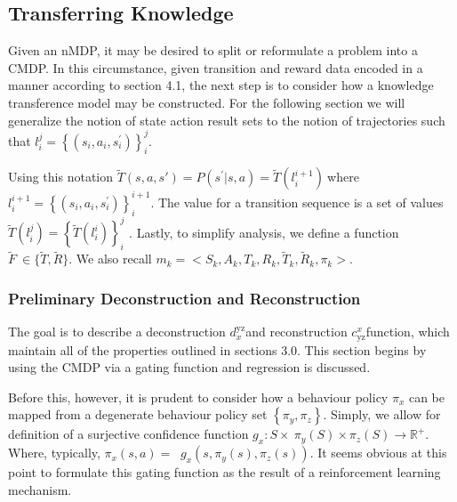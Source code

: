 \documentclass[compsoc,journal,letterpaper,10pt,draftclsnofoot,onecolumn]{IEEEtran}
\begin{document}
\subsection{Transferring Knowledge}\label{transferring-knowledge}

Given an nMDP, it may be desired to split or reformulate a problem into
a CMDP. In this circumstance, given transition and reward data encoded
in a manner according to section 4.1, the next step is to consider how a
knowledge transference model may be constructed. For the following
section we will generalize the notion of state action result sets to the
notion of trajectories such that
\(l_{i}^{j} = \left\{ (s_{i},a_{i},s_{i}^{'}) \right\}_{i}^{j}\).

Using this notation
\(\tilde{T}\left( s,a,s' \right) = P\left( s^{'}|s,a \right) = \tilde{T}\left( l_{i}^{i + 1} \right)\ \)where
\(l_{i}^{i + 1} = \left\{ (s_{i},a_{i},s_{i}^{'}) \right\}_{i}^{i + 1}\).
The value for a transition sequence is a set of values
\(\tilde{T}\left( l_{i}^{j} \right) = \left\{ \tilde{T}\left( l_{i}^{i} \right) \right\}_{i}^{j}\)
. Lastly, to simplify analysis, we define a function
\(\tilde{F}\  \in \{\tilde{T},\tilde{R}\}\). We also recall
\(m_{k} = < S_{k},A_{k},T_{k},R_{k},{\tilde{T}}_{k},{\tilde{R}}_{k},\pi_{k} >\).

\subsubsection{Preliminary Deconstruction and Reconstruction
}\label{preliminary-deconstruction-and-reconstruction}

The goal is to describe a deconstruction \(d_{x}^{\text{yz}}\)and
reconstruction \(c_{\text{yz}}^{x}\)function, which maintain all of the
properties outlined in sections 3.0. This section begins by using the
CMDP via a gating function and regression is discussed.

\label{decision-making-and-gating}

Before this, however, it is prudent to consider how a behaviour policy
\(\pi_{x}\) can be mapped from a degenerate behaviour policy set
\(\left\{ \pi_{y},\pi_{z} \right\}\). Simply, we allow for definition of
a surjective confidence function
\(g_{x}:S \times \ \pi_{y}(S) \times \pi_{z}(S) \rightarrow \mathbb{R}^{+}\).
Where, typically,
\(\pi_{x}\left( s,a \right) = \operatorname{}{g_{x}\left( s,\pi_{y}\left( s \right),\pi_{z}(s) \right)}\).
It seems obvious at this point to formulate this gating function as the
result of a reinforcement learning mechanism.
\end{document}
